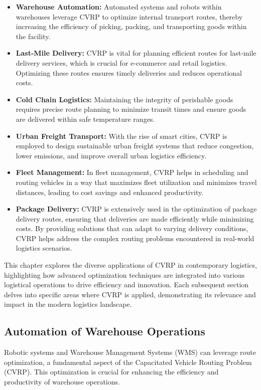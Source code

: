 \documentclass[
]{article}
\begin{document}
\begin{itemize}
    \item \textbf{Warehouse Automation:} Automated systems and robots within warehouses leverage CVRP to optimize internal transport routes, thereby increasing the efficiency of picking, packing, and transporting goods within the facility.
    \item \textbf{Last-Mile Delivery:} CVRP is vital for planning efficient routes for last-mile delivery services, which is crucial for e-commerce and retail logistics. Optimizing these routes ensures timely deliveries and reduces operational costs.
    \item \textbf{Cold Chain Logistics:} Maintaining the integrity of perishable goods requires precise route planning to minimize transit times and ensure goods are delivered within safe temperature ranges.
    \item \textbf{Urban Freight Transport:} With the rise of smart cities, CVRP is employed to design sustainable urban freight systems that reduce congestion, lower emissions, and improve overall urban logistics efficiency.
    \item \textbf{Fleet Management:} In fleet management, CVRP helps in scheduling and routing vehicles in a way that maximizes fleet utilization and minimizes travel distances, leading to cost savings and enhanced productivity.
    \item \textbf{Package Delivery:} CVRP is extensively used in the optimization of package delivery routes, ensuring that deliveries are made efficiently while minimizing costs. By providing solutions that can adapt to varying delivery conditions, CVRP helps address the complex routing problems encountered in real-world logistics scenarios.
  \end{itemize}

This chapter explores the diverse applications of CVRP in contemporary logistics, highlighting how advanced optimization techniques are integrated into various logistical operations to drive efficiency and innovation. Each subsequent section delves into specific areas where CVRP is applied, demonstrating its relevance and impact in the modern logistics landscape.




\subsection{Automation of Warehouse Operations}

Robotic systems and Warehouse Management Systems (WMS) can leverage route optimization, a fundamental aspect of the Capacitated Vehicle Routing Problem (CVRP). This optimization is crucial for enhancing the efficiency and productivity of warehouse operations.
\end{document}
